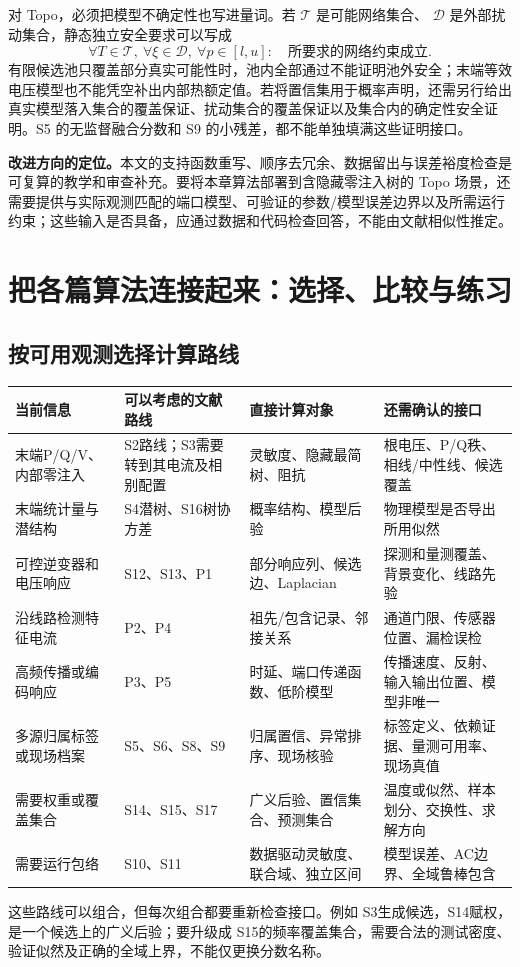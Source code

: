 \documentclass[UTF8,11pt,fontset=fandol,openany,oneside]{ctexbook}
\theoremstyle{definition}
\theoremstyle{remark}
\numberwithin{equation}{chapter}
\begin{document}
对 Topo，必须把模型不确定性也写进量词。若 $\mathcal T$ 是可能网络集合、
$\mathcal D$ 是外部扰动集合，静态独立安全要求可以写成
\begin{equation}
 \forall T\in\mathcal T,\ \forall\xi\in\mathcal D,\
 \forall p\in[l,u]:\quad \text{所要求的网络约束成立}.
 \label{eq:oe_s11_topo_interface}
\end{equation}
有限候选池只覆盖部分真实可能性时，池内全部通过不能证明池外安全；末端等效电压模型也不能凭空补出内部热额定值。若将置信集用于概率声明，还需另行给出真实模型落入集合的覆盖保证、扰动集合的覆盖保证以及集合内的确定性安全证明。S5 的无监督融合分数和 S9 的小残差，都不能单独填满这些证明接口。

\textbf{改进方向的定位。}本文的支持函数重写、顺序去冗余、数据留出与误差裕度检查是可复算的教学和审查补充。要将本章算法部署到含隐藏零注入树的 Topo 场景，还需要提供与实际观测匹配的端口模型、可验证的参数/模型误差边界以及所需运行约束；这些输入是否具备，应通过数据和代码检查回答，不能由文献相似性推定。



\chapter{把各篇算法连接起来：选择、比较与练习}
\label{ch:integration}
\section{按可用观测选择计算路线}
\begin{longtable}{p{}p{}p{}p{}}
\toprule 当前信息 & 可以考虑的文献路线 & 直接计算对象 & 还需确认的接口\\\midrule\endhead
末端P/Q/V、内部零注入 & S2路线；S3需要转到其电流及相别配置 & 灵敏度、隐藏最简树、阻抗 & 根电压、P/Q秩、相线/中性线、候选覆盖\\
末端统计量与潜结构 & S4潜树、S16树协方差 & 概率结构、模型后验 & 物理模型是否导出所用似然\\
可控逆变器和电压响应 & S12、S13、P1 & 部分响应列、候选边、Laplacian & 探测和量测覆盖、背景变化、线路先验\\
沿线路检测特征电流 & P2、P4 & 祖先/包含记录、邻接关系 & 通道门限、传感器位置、漏检误检\\
高频传播或编码响应 & P3、P5 & 时延、端口传递函数、低阶模型 & 传播速度、反射、输入输出位置、模型非唯一\\
多源归属标签或现场档案 & S5、S6、S8、S9 & 归属置信、异常排序、现场核验 & 标签定义、依赖证据、量测可用率、现场真值\\
需要权重或覆盖集合 & S14、S15、S17 & 广义后验、置信集合、预测集合 & 温度或似然、样本划分、交换性、求解方向\\
需要运行包络 & S10、S11 & 数据驱动灵敏度、联合域、独立区间 & 模型误差、AC边界、全域鲁棒包含\\
\bottomrule
\end{longtable}
这些路线可以组合，但每次组合都要重新检查接口。例如 S3生成候选，S14赋权，是一个候选上的广义后验；要升级成 S15的频率覆盖集合，需要合法的测试密度、验证似然及正确的全域上界，不能仅更换分数名称。
\end{document}
